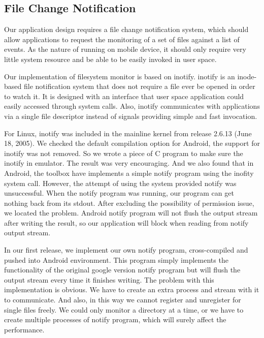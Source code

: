 \subsection{File Change Notification}
Our application design requires a file change notification system, which should allow applications to request 
the monitoring of a set of files against a list of events. As the nature of running on mobile device, it should 
only require very little system resource and be able to be easily invoked in user space. 

Our implementation of filesystem monitor is based on inotify. inotify is an inode-based file notification system 
that does not require a file ever be opened in order to watch it. It is designed with an interface that user space 
application could easily accessed through system calls. Also, inotify communicates with applications via a single 
file descriptor instead of signals providing simple and fast invocation.

For Linux, inotify was included in the mainline kernel from release 2.6.13 (June 18, 2005)\cite{Love:2005p1294}. We 
checked the default compilation option for Android, the support for inotify was not removed. So we wrote a piece of 
C program to make sure the inotify in emulator. The result was very encouraging. And we also found that in Android, 
the toolbox have implements a simple notify program using the inofity system call. However, the attempt of using the 
system provided notify was unsuccessful. When the notify program was running, our program can get nothing back from 
its stdout. After excluding the possibility of permission issue, we located the problem. Android notify program will 
not flush the output stream after writing the result, so our application will block when reading from notify output 
stream. 

In our first release, we implement our own notify program, cross-compiled and pushed into Android environment. This 
program simply implements the functionality of the original google version notify program but will flush the output 
stream every time it finishes writing. The problem with this implementation is obvious. We have to create an extra process 
and stream with it to communicate. And also, in this way we cannot register and unregister for single files freely. 
We could only monitor a directory at a time, or we have to create multiple processes of notify program, which will surely 
affect the performance. 


